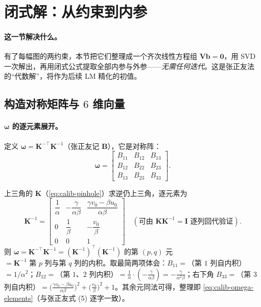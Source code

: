 \section{闭式解：从约束到内参}
\label{sec:calib-closed}

\paragraph{这一节解决什么。}
有了每幅图的两约束，本节把它们整理成一个齐次线性方程组 $\mathbf{V}\mathbf{b}=\mathbf{0}$，用 SVD 一次解出，再用闭式公式提取全部内参与外参——\emph{无需任何迭代}。这是张正友法的“代数解”，将作为后续 LM 精化的初值。

\subsection{构造对称矩阵与 \texorpdfstring{$6$}{6} 维向量}
\label{sec:calib-b-vector}

\paragraph{$\boldsymbol{\omega}$ 的逐元素展开。}
定义 $\boldsymbol{\omega}=\mathbf{K}^{-\top}\mathbf{K}^{-1}$（张正友记 $\mathbf{B}$），它是对称阵：
\begin{equation}
  \boldsymbol{\omega}=\begin{bmatrix} B_{11}&B_{12}&B_{13}\\ B_{12}&B_{22}&B_{23}\\ B_{13}&B_{23}&B_{33}\end{bmatrix}.
\end{equation}

\begin{derivation}
上三角的 $\mathbf{K}$（\cref{eq:calib-pinhole}）求逆仍上三角，逐元素为
\[
  \mathbf{K}^{-1}=\begin{bmatrix}
  \dfrac{1}{\alpha} & -\dfrac{\gamma}{\alpha\beta} & \dfrac{\gamma v_0-\beta u_0}{\alpha\beta}\\[1.6ex]
  0 & \dfrac{1}{\beta} & -\dfrac{v_0}{\beta}\\[1.2ex]
  0 & 0 & 1
  \end{bmatrix}
  \quad(\text{可由 }\mathbf{K}\mathbf{K}^{-1}=\mathbf{I}\text{ 逐列回代验证}).
\]
则 $\boldsymbol{\omega}=\mathbf{K}^{-\top}\mathbf{K}^{-1}=(\mathbf{K}^{-1})^\top(\mathbf{K}^{-1})$ 的第 $(p,q)$ 元 $=\mathbf{K}^{-1}\text{ 第 }p\text{ 列与第 }q\text{ 列的内积}$。取最简两项体会：$B_{11}=$（第 $1$ 列自内积）$=1/\alpha^2$；$B_{12}=$（第 $1$、$2$ 列内积）$=\tfrac{1}{\alpha}\cdot(-\tfrac{\gamma}{\alpha\beta})=-\tfrac{\gamma}{\alpha^2\beta}$；右下角 $B_{33}=$（第 $3$ 列自内积）$=\big(\tfrac{\gamma v_0-\beta u_0}{\alpha\beta}\big)^2+\big(\tfrac{v_0}{\beta}\big)^2+1$。其余元同法可得，整理即 \cref{eq:calib-omega-elements}（与张正友式 (5) 逐字一致）。
\end{derivation}

